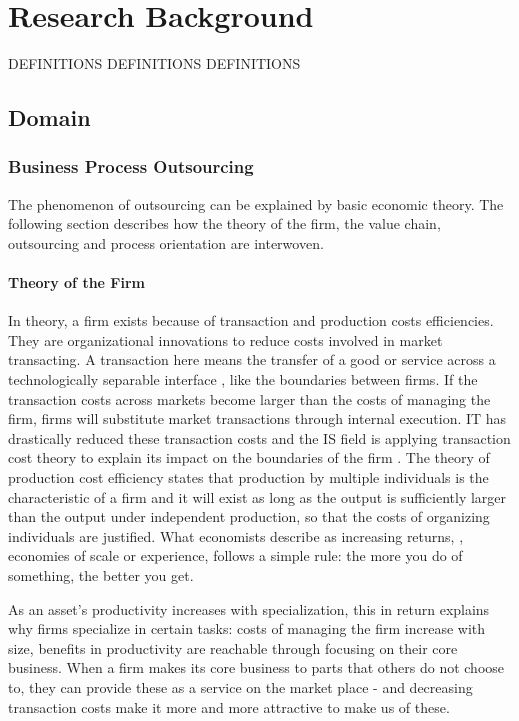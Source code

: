 
\chapter{Research Background}
	DEFINITIONS DEFINITIONS DEFINITIONS
	\section{Domain}
		\subsection{Business Process Outsourcing}
		The phenomenon of outsourcing can be explained by basic economic theory. The following section describes how the theory of the firm, the value chain, outsourcing and process orientation are interwoven. 
		
		
		\subsubsection{Theory of the Firm}
		In theory, a firm exists because of transaction and production costs efficiencies. They are organizational innovations to reduce costs involved in market transacting. A transaction here means the transfer of a good or service across a technologically separable interface \cite{williamson1981economics, williamson1971vertical}, like the boundaries between firms. If the transaction costs across markets become larger than the costs of managing the firm, firms will substitute market transactions through internal execution. IT has drastically reduced these transaction costs and the IS field is applying transaction cost theory to explain its impact on the boundaries of the firm \cite{aron2005just}.
		The theory of production cost efficiency states that production by multiple individuals is the characteristic of a firm \cite{alchian1972production} and it will exist as long as the output is sufficiently larger than the output under independent production, so that the costs of organizing individuals are justified. What economists describe as increasing returns, \ie, economies of scale or experience, follows a simple rule: the more you do of something, the better you get. 
		
		As an asset's productivity increases with specialization, this in return explains why firms specialize in certain tasks: costs of managing the firm increase with size,  benefits in productivity are reachable through focusing on their core business.
		When a firm makes its core business to parts that others do not choose to, they can provide these as a service on the market place - and decreasing transaction costs make it more and more attractive to make us of these. 
		
